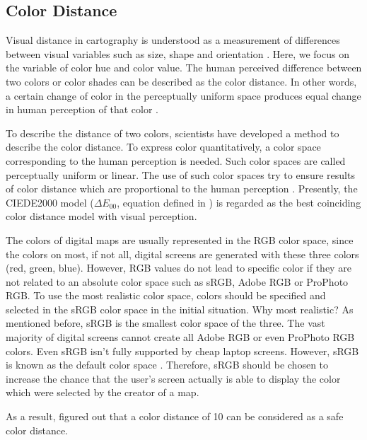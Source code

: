 \subsection{Color Distance}\label{subsection:distance}
Visual distance in cartography is understood as a measurement of differences between visual variables such as size, shape and orientation \parencite{brychtova2015}. Here, we focus on the variable of color hue and color value. The human perceived difference between two colors or color shades can be described as the color distance. In other words, a certain change of color in the perceptually uniform space produces equal change in human perception of that color \parencite{brychtovaC2017}.

To describe the distance of two colors, scientists have developed a method to describe the color distance. To express color quantitatively, a color space corresponding to the human perception is needed. Such color spaces are called perceptually uniform or linear. The use of such color spaces try to ensure results of color distance which are proportional to the human perception \parencite{brychtova2015}. Presently, the CIEDE2000 model ($\Delta E_{00}$, equation defined in \textcite{brychtova2015}) is regarded as the best coinciding color distance model with visual perception. 
 
The colors of digital maps are usually represented in the RGB color space, since the colors on most, if not all, digital screens are generated with these three colors (red, green, blue). However, RGB values do not lead to specific color if they are not related to an absolute color space such as sRGB, Adobe RGB or ProPhoto RGB. To use the most realistic color space, colors should be specified and selected in the sRGB color space in the initial situation. Why most realistic? As mentioned before, sRGB is the smallest color space of the three. The vast majority of digital screens cannot create all Adobe RGB or even ProPhoto RGB colors. Even sRGB isn't fully supported by cheap laptop screens. However, sRGB is known as the default color space \parencite{kenrockwell2006}. Therefore, sRGB should be chosen to increase the chance that the user's screen actually is able to display the color which were selected by the creator of a map. 

As a result, \textcite{brychtovaC2015, brychtovaC2016} figured out that a color distance of 10 can be considered as a safe color distance.

